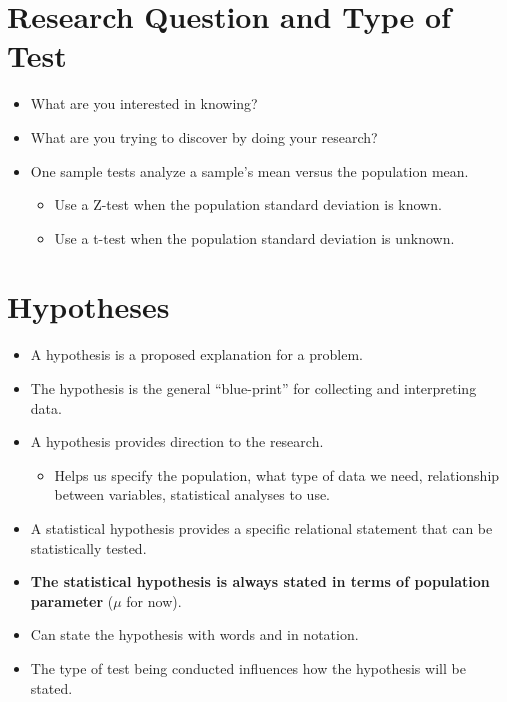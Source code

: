 \documentclass[12pt]{article}
\begin{document}
\section{Research Question and Type of
Test}\label{research-question-and-type-of-test}

\begin{itemize}
\itemsep1pt\parskip0pt
\item
  What are you interested in knowing?
\item
  What are you trying to discover by doing your research?
\item
  One sample tests analyze a sample's mean versus the population mean.

  \begin{itemize}
  \itemsep1pt\parskip0pt
  \item
    Use a Z-test when the population standard deviation is known.
  \item
    Use a t-test when the population standard deviation is unknown.
  \end{itemize}
\end{itemize}

\section{Hypotheses}\label{hypotheses}

\begin{itemize}
\itemsep1pt\parskip0pt
\item
  A hypothesis is a proposed explanation for a problem.
\item
  The hypothesis is the general ``blue-print'' for collecting and
  interpreting data.
\item
  A hypothesis provides direction to the research.

  \begin{itemize}
  \itemsep1pt\parskip0pt
  \item
    Helps us specify the population, what type of data we need,
    relationship between variables, statistical analyses to use.
  \end{itemize}
\item
  A statistical hypothesis provides a specific relational statement that
  can be statistically tested.
\item
  \textbf{The statistical hypothesis is always stated in terms of
  population parameter} (\(\mu\) for now).
\item
  Can state the hypothesis with words and in notation.
\item
  The type of test being conducted influences how the hypothesis will be
  stated.
\end{itemize}
\end{document}
